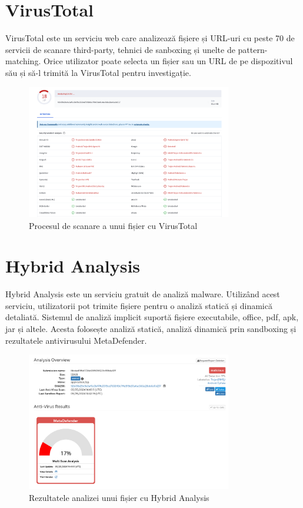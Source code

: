 \documentclass[12pt,a4paper]{report}
\begin{document}
\section{VirusTotal}
VirusTotal\cite{virustotal} este un serviciu web care analizează fișiere și URL-uri cu peste 70 de servicii de scanare third-party, tehnici de sanboxing și unelte de pattern-matching.
Orice utilizator poate selecta un fișier sau un URL de pe dispozitivul său și să-l trimită la VirusTotal pentru investigație.
\begin{figure}[H]
      \centering
      \includegraphics[width=0.8\textwidth]{visuals/virustotal.png}
      \caption{Procesul de scanare a unui fișier cu VirusTotal}
      \label{fig:vt_scan}
\end{figure}
\section{Hybrid Analysis}
Hybrid Analysis\cite{hybridanalysis} este un serviciu gratuit de analiză malware.
Utilizând acest serviciu, utilizatorii pot trimite fișiere pentru o analiză statică și dinamică detaliată.
Sistemul de analiză implicit suportă fișiere executabile, office, pdf, apk, jar și altele.
Acesta folosește analiză statică, analiză dinamică prin sandboxing și rezultatele antivirusului MetaDefender\cite{metadefener}.
\begin{figure}[H]
      \centering
      \includegraphics[width=0.8\textwidth]{visuals/hybrid_analysis.png}
      \caption{Rezultatele analizei unui fișier cu Hybrid Analysis}
      \label{fig:hybrid_analysis_result}
\end{figure}
\end{document}
